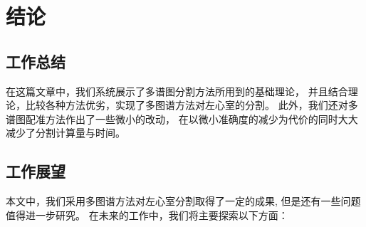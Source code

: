 
\chapter{结论}
\section{工作总结}
在这篇文章中，我们系统展示了多谱图分割方法所用到的基础理论，
并且结合理论，比较各种方法优劣，实现了多图谱方法对左心室的分割。
此外，我们还对多谱图配准方法作出了一些微小的改动，
在以微小准确度的减少为代价的同时大大减少了分割计算量与时间。

\section{工作展望}
本文中，我们采用多图谱方法对左心室分割取得了一定的成果,
但是还有一些问题值得进一步研究。
在未来的工作中，我们将主要探索以下方面：
